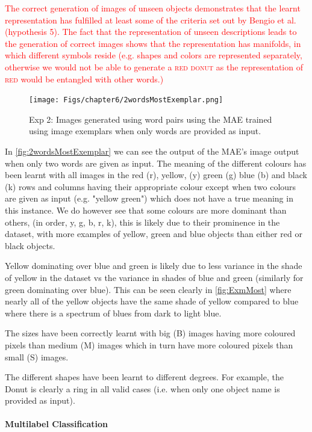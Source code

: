 \textcolor{red}{The correct generation of images of unseen objects demonstrates that the learnt representation has fulfilled at least some of the criteria set out by Bengio et al. \cite{repRev} (hypothesis 5). The fact that the representation of unseen descriptions leads to the generation of correct images shows that the representation has manifolds, in which different symbols reside (e.g. shapes and colors are represented separately, otherwise we would not be able to generate a \textsc{red donut} as the representation of \textsc{red} would be entangled with other words.)}

\begin{figure}[ht]
    \centering
    \texttt{[image: Figs/chapter6/2wordsMostExemplar.png]}
    \caption{Exp 2: Images generated using word pairs using the \ac{MAE} trained using image exemplars when only words are provided as input.}
    \label{fig:2wordsMostExemplar}
\end{figure}


In \autoref{fig:2wordsMostExemplar} we can see the output of the \ac{MAE}'s image output when only two words are given as input. The meaning of the different colours has been learnt with all images in the red (r), yellow, (y) green (g) blue (b) and black (k) rows and columns having their appropriate colour except when two colours are given as input (e.g. "yellow green") which does not have a true meaning in this instance. We do however see that some colours are more dominant than others, (in order, y, g, b, r, k), this is likely due to their prominence in the dataset, with more examples of yellow, green and blue objects than either red or black objects. 

Yellow dominating over blue and green is likely due to less variance in the shade of yellow in the dataset vs the variance in shades of blue and green (similarly for green dominating over blue). This can be seen clearly in \autoref{fig:ExmMost} where nearly all of the yellow objects have the same shade of yellow compared to blue where there is a spectrum of blues from dark to light blue.

The sizes have been correctly learnt with big (B) images having more coloured pixels than medium (M) images which in turn have more coloured pixels than small (S) images.

The different shapes have been learnt to different degrees. For example, the Donut is clearly a ring in all valid cases (i.e. when only one object name is provided as input).

\paragraph{Multilabel Classification}

